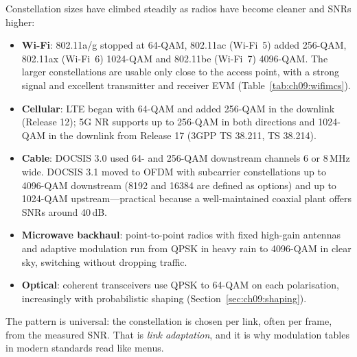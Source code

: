 
\begin{inpractice}
Constellation sizes have climbed steadily as radios have become cleaner and SNRs higher:
\begin{itemize}
\item \textbf{Wi-Fi}: 802.11a/g stopped at 64-QAM, 802.11ac (Wi-Fi~5) added 256-QAM, 802.11ax
(Wi-Fi~6) 1024-QAM and 802.11be (Wi-Fi~7) 4096-QAM. The larger constellations are usable only
close to the access point, with a strong signal and excellent transmitter and receiver EVM
(Table~\ref{tab:ch09:wifimcs}).
\item \textbf{Cellular}: LTE began with 64-QAM and added 256-QAM in the downlink (Release 12);
5G NR supports up to 256-QAM in both directions and 1024-QAM in the downlink from Release 17
(3GPP TS 38.211, TS 38.214).
\item \textbf{Cable}: DOCSIS 3.0 used 64- and 256-QAM downstream channels 6 or 8\,MHz wide.
DOCSIS 3.1 moved to OFDM with subcarrier constellations up to 4096-QAM downstream (8192 and 16384
are defined as options) and up to 1024-QAM upstream---practical because a well-maintained coaxial
plant offers SNRs around 40\,dB.
\item \textbf{Microwave backhaul}: point-to-point radios with fixed high-gain antennas and adaptive
modulation run from QPSK in heavy rain to 4096-QAM in clear sky, switching without dropping
traffic.
\item \textbf{Optical}: coherent transceivers use QPSK to 64-QAM on each polarisation, increasingly
with probabilistic shaping (Section~\ref{sec:ch09:shaping}).
\end{itemize}
The pattern is universal: the constellation is chosen per link, often per frame, from the measured
SNR. That is \emph{link adaptation}, and it is why modulation tables in modern standards read like
menus.
\end{inpractice}


